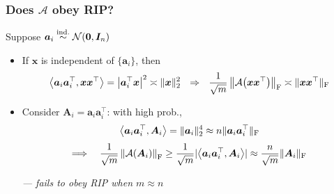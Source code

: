 \documentclass[compress,
mathserif,wide,%
]{beamer}
\begin{document}
\begin{frame}[label={slide:PR-example-RIP}]
\frametitle{Does $\mathcal{A}$ obey RIP?} 


	Suppose $\bm{a}_i \overset{\mathrm{ind.}}{\sim} \mathcal{N}( \bm{0}, {\bm I}_n )$
\medskip
\begin{itemize}
\item<1> If $\bm{x}$ is independent of $\{\bm{a}_i\}$, then
\[
   \big\langle \bm{a}_i \bm{a}_i^{\top} , \bm{x} \bm{x}^{\top}  \big\rangle  =  \big| \bm{a}_i^{\top} \bm{x} \big|^2  \asymp \| {\bm x} \|_2^2 
   ~~ \Rightarrow ~~   
  \frac{1}{ \sqrt{m}} \left\|  \mathcal{A} \big({\bm x} {\bm x}^{\top}\big) \right\|_{\mathrm{F}} \asymp \| {\bm x} {\bm x}^{\top} \|_{\mathrm{F}}
\]
\item<1> Consider $\bm{A}_i = \bm{a}_i \bm{a}_i ^{\top}$: with high prob.,
\begin{align*}
   \big\langle \bm{a}_i \bm{a}_i^{\top} , \bm{A}_i  \big\rangle  =  \| \bm{a}_i \|_2^4  \approx n  \| \bm{a}_i {\bm a}_i^{\top} \|_{\mathrm{F}}
\end{align*}
\[   
   \Longrightarrow \quad   
  \frac{1}{ \sqrt{m}}  \left\| \mathcal{A} ( {\bm A}_i ) \right\|_{\mathrm{F}} \geq \frac{1}{ \sqrt{m}} |\big\langle \bm{a}_i \bm{a}_i^{\top} , \bm{A}_i  \big\rangle|  
   \approx \frac{n}{ \sqrt{m}} \| \bm{A}_i \|_{\mathrm{F}}
\]

{\em \hfill --- fails to obey RIP when $m \approx n$}
\end{itemize}

\end{frame}
\end{document}

